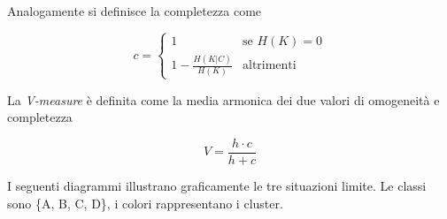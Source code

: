 \documentclass[12pt,a4paper,twoside]{report}
\begin{document}
Analogamente si definisce la completezza come

\begin{equation} \label{eq:c}
    c = \begin{cases} 1 & \mbox{se } H(K) = 0 \\ 1-\frac{H(K|C)}{H(K)} & \mbox{altrimenti} \end{cases}
\end{equation}

La \textit{V-measure} è definita come la media armonica dei due valori di omogeneità e completezza

\begin{equation} \label{eq:v}
    V = \frac{h \cdot c}{h + c}
\end{equation}


I seguenti diagrammi illustrano graficamente le tre situazioni limite. Le classi sono \{A, B, C,
D\}, i colori rappresentano i cluster.
\end{document}
